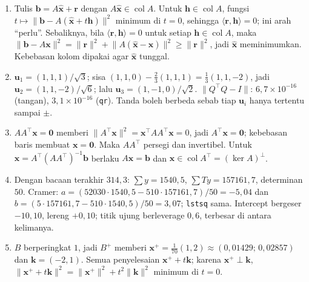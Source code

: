 \begin{enumerate}[label=\textbf{10.\arabic*}]
  \item 
Tulis $\mathbf{b}=A\hat{\mathbf{x}}+\mathbf{r}$ dengan
        $A\hat{\mathbf{x}}\in\operatorname{col}A$. Untuk
        $\mathbf{h}\in\operatorname{col}A$, fungsi
        $t\mapsto\lVert\mathbf{b}-A(\hat{\mathbf{x}}+t\mathbf{h})\rVert^{2}$ minimum
        di $t=0$, sehingga $\langle\mathbf{r},\mathbf{h}\rangle=0$; ini arah
        ``perlu''. Sebaliknya, bila $\langle\mathbf{r},\mathbf{h}\rangle=0$ untuk
        setiap $\mathbf{h}\in\operatorname{col}A$, maka
        $\lVert\mathbf{b}-A\mathbf{x}\rVert^{2}=\lVert\mathbf{r}\rVert^{2}+\lVert
        A(\hat{\mathbf{x}}-\mathbf{x})\rVert^{2}\ge\lVert\mathbf{r}\rVert^{2}$, jadi
        $\hat{\mathbf{x}}$ meminimumkan. Kebebasan kolom dipakai agar
        $\hat{\mathbf{x}}$ tunggal.

  \item $\mathbf{u}_{1}=(1,1,1)/\sqrt3$; sisa $(1,1,0)-\frac23(1,1,1)
        =\frac13(1,1,-2)$, jadi $\mathbf{u}_{2}=(1,1,-2)/\sqrt6$; lalu
        $\mathbf{u}_{3}=(1,-1,0)/\sqrt2$. $\lVert Q^{\top}Q-I\rVert$:
        $6{,}7\times10^{-16}$ (tangan), $3{,}1\times10^{-16}$ (\texttt{qr}).
        Tanda boleh berbeda sebab tiap $\mathbf{u}_{i}$ hanya tertentu sampai
        $\pm$.

  \item $AA^{\top}\mathbf{x}=\mathbf{0}$ memberi
        $\lVert A^{\top}\mathbf{x}\rVert^{2}=\mathbf{x}^{\top}AA^{\top}
        \mathbf{x}=0$, jadi $A^{\top}\mathbf{x}=\mathbf{0}$; kebebasan baris
        membuat $\mathbf{x}=\mathbf{0}$. Maka $AA^{\top}$ persegi dan invertibel.
        Untuk $\mathbf{x}=A^{\top}(AA^{\top})^{-1}\mathbf{b}$ berlaku
        $A\mathbf{x}=\mathbf{b}$ dan
        $\mathbf{x}\in\operatorname{col}A^{\top}=(\ker A)^{\perp}$.

  \item Dengan bacaan terakhir $314{,}3$: $\sum y=1540{,}5$,
        $\sum Ty=157161{,}7$, determinan $50$. Cramer:
        $a=(52030\cdot1540{,}5-510\cdot157161{,}7)/50=-5{,}04$ dan
        $b=(5\cdot157161{,}7-510\cdot1540{,}5)/50=3{,}07$;
        \texttt{lstsq} sama. Intercept bergeser $-10{,}10$, lereng $+0{,}10$;
        titik ujung berleverage $0{,}6$, terbesar di antara kelimanya.

  \item $B$ berperingkat $1$, jadi $B^{+}$ memberi
        $\mathbf{x}^{+}=\frac{1}{70}(1,2)\approx(0{,}01429;\,0{,}02857)$ dan
        $\mathbf{k}=(-2,1)$. Semua penyelesaian $\mathbf{x}^{+}+t\mathbf{k}$;
        karena $\mathbf{x}^{+}\perp\mathbf{k}$,
        $\lVert\mathbf{x}^{+}+t\mathbf{k}\rVert^{2}=\lVert\mathbf{x}^{+}
        \rVert^{2}+t^{2}\lVert\mathbf{k}\rVert^{2}$ minimum di $t=0$.
\end{enumerate}


